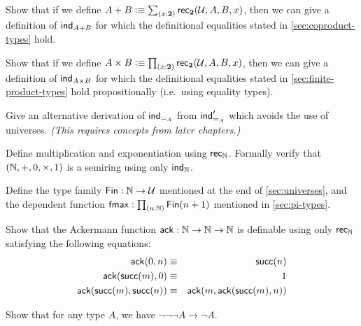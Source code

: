 \begin{ex}\label{ex:sum-via-bool}
Show that if we define $A + B \defeq \sm{x:\bool} \rec{\bool}(\UU,A,B,x)$, then we can give a definition of $\mathsf{ind}_{A+B}$ for which the definitional equalities stated in \autoref{sec:coproduct-types} hold.
\end{ex}

\begin{ex}\label{ex:prod-via-bool}
Show that if we define $A \times B \defeq \prd{x:\bool}\rec{\bool}(\UU,A,B,x)$, then we can give a definition of  $\mathsf{ind}_{A\times B}$ for which the definitional equalities stated in \autoref{sec:finite-product-types} hold propositionally (i.e.\ using equality types).
\end{ex}

\begin{ex}\label{ex:pm-to-ml}
Give an alternative derivation of $\mathsf{ind}_{=_{A}}$ from $\mathsf{ind}_{=_{A}}'$ which avoids the use of universes.
  \emph{(This requires concepts from later chapters.)}
\end{ex}

\begin{ex}
Define multiplication and exponentiation using $\mathsf{rec}_{\mathbb{N}}$. Formally verify that $(\mathbb{N},+,0,\times,1)$ is a semiring using only $\mathsf{ind}_{\mathbb{N}}$.  
\end{ex}

\begin{ex}\label{ex:fin}
  Define the type family $\mathsf{Fin} : \mathbb{N} \to \mathcal{U}$ mentioned at the end of \autoref{sec:universes}, and the dependent function $\fmax : \prd{n:\nat} \Fin(n+1)$ mentioned in \autoref{sec:pi-types}.
\end{ex}

\begin{ex}\label{ex:ackermann}
  Show that the Ackermann function $\mathsf{ack} : \mathbb{N} \to \mathbb{N} \to \mathbb{N}$ is definable using only $\mathsf{rec}_{\mathbb{N}}$ satisfying the following equations:
  \begin{eqnarray*}
    \mathsf{ack}(0,n) & \equiv & \mathsf{succ}(n) \\
    \mathsf{ack}(\mathsf{succ}(m),0) & \equiv & 1 \\
    \mathsf{ack}(\mathsf{succ}(m),\mathsf{succ}(n)) & \equiv & \mathsf{ack}(m,\mathsf{ack}(\mathsf{succ}(m),n))
  \end{eqnarray*}
\end{ex}

\begin{ex}\label{ex:neg-ldn}
  Show that for any type $A$, we have $\neg\neg\neg A \to \neg A$.
\end{ex}

